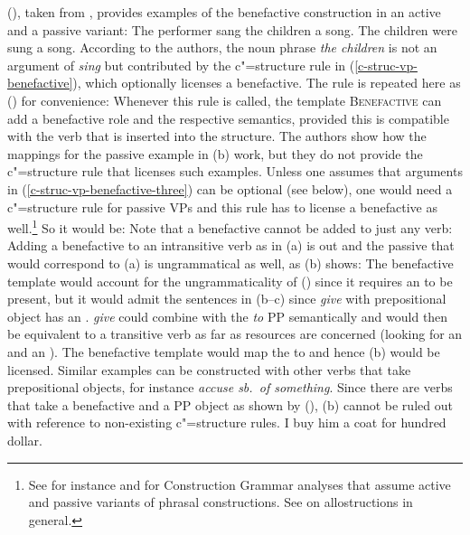 (), taken from \citet[]{AGT2014a}, provides examples of the benefactive construction
in an active and a passive variant:
\eal
\ex The performer sang the children a song.
\ex The children were sung a song. 
\zl
According to the authors, the noun phrase \emph{the children} is not an argument of \emph{sing} but
contributed by the c"=structure rule in (\ref{c-struc-vp-benefactive}), which optionally licenses a
benefactive. The rule is repeated here as () for convenience:
\ea\label{c-struc-vp-benefactive-three}
\z
Whenever this rule is called, the template \textsc{Benefactive} can add a benefactive role and the
respective semantics, provided this is compatible with the verb that is inserted into the structure. The
authors show how the mappings for the passive example in (b) work, but they do not provide
the c"=structure rule that licenses such examples. Unless one assumes that arguments in
(\ref{c-struc-vp-benefactive-three}) can be optional (see below), one would need a c"=structure rule for
passive VPs and this rule has to license a benefactive as well.\footnote{%
  See for instance  and  for Construction Grammar analyses that assume active
  and passive variants of phrasal constructions. See  on allostructions in general.
  } So it would be:
\ea\label{c-struc-vp-benefactive-passive}
\z
Note that a benefactive cannot be added to just any verb: Adding a benefactive to an intransitive verb as
in (a) is out and the passive that would correspond to (a) is ungrammatical as well,
as (b) shows:
\eal
{}
\zl
The benefactive template would account for the ungrammaticality of () since it requires an
\argtwo to be present, but it would admit the sentences in (b--c) since \emph{give} with
prepositional object has an \argtwo \citep[]{Kibort2008a}.
\eal
{}
\zl
\emph{give} could combine with the \emph{to} PP semantically and would then be equivalent to a
transitive verb as far as resources are concerned (looking for an \argone and an \argtwo). The
benefactive template would map the \argtwo to \argthree and hence (b) would be
licensed. Similar examples can be constructed with other verbs that take prepositional objects, for
instance \emph{accuse sb.\ of something}.
Since there are verbs that take a benefactive and a PP object as shown by (), (b) cannot be ruled out
with reference to non-existing c"=structure rules.
\ea
I buy him a coat for hundred dollar.
\z

